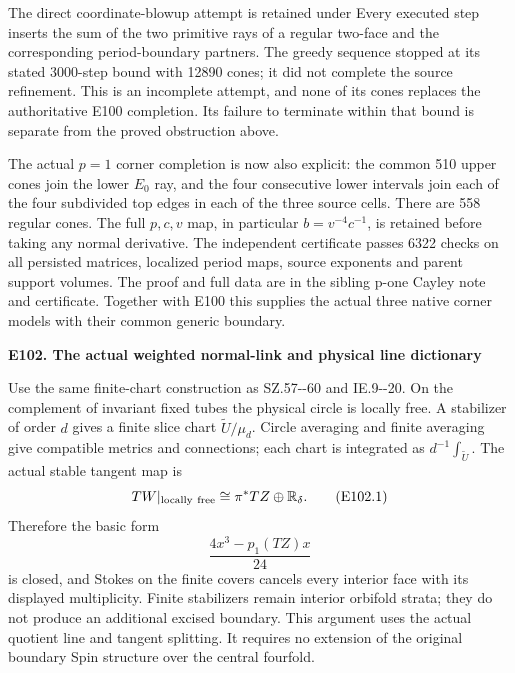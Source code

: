 The direct coordinate-blowup attempt is retained under  Every executed step inserts the sum of the two primitive rays of a regular two-face and the corresponding period-boundary partners. The greedy sequence stopped at its stated 3000-step bound with 12890 cones; it did not complete the source refinement. This is an incomplete attempt, and none of its cones replaces the authoritative E100 completion. Its failure to terminate within that bound is separate from the proved obstruction above.

The actual \(p=1\) corner completion is now also explicit: the common 510 upper cones join the lower \(E_0\) ray, and the four consecutive lower intervals join each of the four subdivided top edges in each of the three source cells. There are 558 regular cones. The full \(p,c,v\) map, in particular \(b=v^{-4}c^{-1}\), is retained before taking any normal derivative. The independent certificate  passes 6322 checks on all persisted matrices, localized period maps, source exponents and parent support volumes. The proof and full data are in the sibling p-one Cayley note and certificate. Together with E100 this supplies the actual three native corner models with their common generic boundary.

\par

\medskip\noindent\textbf{E102. The actual weighted normal-link and physical line dictionary}

\par\nobreak

Use the same finite-chart construction as SZ.57-\/-60 and IE.9-\/-20. On the complement of invariant fixed tubes the physical circle is locally free. A stabilizer of order \(d\) gives a finite slice chart \(\widetilde U/\mu_d\). Circle averaging and finite averaging give compatible metrics and connections; each chart is integrated as \(d^{-1}\int_{\widetilde U}\). The actual stable tangent map is
\[
 TW|_{\rm locally\ free}\cong\pi^*TZ\oplus\mathbb R_\delta.
 \tag{E102.1}
\]
Therefore the basic form
\[
              \frac{4x^3-p_1(TZ)x}{24}
 \tag{E102.2}
\]
is closed, and Stokes on the finite covers cancels every interior face with its displayed multiplicity. Finite stabilizers remain interior orbifold strata; they do not produce an additional excised boundary. This argument uses the actual quotient line and tangent splitting. It requires no extension of the original boundary Spin structure over the central fourfold.


